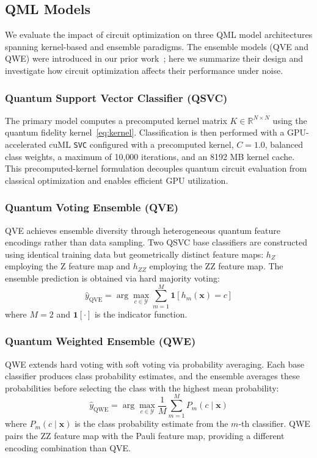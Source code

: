 \documentclass{ieeeaccess}
\begin{document}
\subsection{QML Models}
\label{sec:models}

We evaluate the impact of circuit optimization on three QML model architectures spanning kernel-based and ensemble paradigms. The ensemble models (QVE and QWE) were introduced in our prior work~\cite{AuthorQVEQWE2025}; here we summarize their design and investigate how circuit optimization affects their performance under noise.

\subsubsection{Quantum Support Vector Classifier (QSVC)}
The primary model computes a precomputed kernel matrix $K \in \mathbb{R}^{N \times N}$ using the quantum fidelity kernel~\eqref{eq:kernel}. Classification is then performed with a GPU-accelerated cuML \texttt{SVC} configured with a precomputed kernel, $C = 1.0$, balanced class weights, a maximum of 10{,}000 iterations, and an 8192 MB kernel cache. This precomputed-kernel formulation decouples quantum circuit evaluation from classical optimization and enables efficient GPU utilization.

\subsubsection{Quantum Voting Ensemble (QVE)}
QVE achieves ensemble diversity through heterogeneous quantum feature encodings rather than data sampling. Two QSVC base classifiers are constructed using identical training data but geometrically distinct feature maps: $h_Z$ employing the Z feature map and $h_{ZZ}$ employing the ZZ feature map. The ensemble prediction is obtained via hard majority voting:
\begin{equation}
\hat{y}_{\text{QVE}} = \arg\max_{c \in \mathcal{Y}} \sum_{m=1}^{M} \mathbf{1}[h_m(\mathbf{x}) = c]
\label{eq:qve}
\end{equation}
where $M = 2$ and $\mathbf{1}[\cdot]$ is the indicator function.

\subsubsection{Quantum Weighted Ensemble (QWE)}
QWE extends hard voting with soft voting via probability averaging. Each base classifier produces class probability estimates, and the ensemble averages these probabilities before selecting the class with the highest mean probability:
\begin{equation}
\hat{y}_{\text{QWE}} = \arg\max_{c \in \mathcal{Y}} \frac{1}{M} \sum_{m=1}^{M} P_m(c \mid \mathbf{x})
\label{eq:qwe}
\end{equation}
where $P_m(c \mid \mathbf{x})$ is the class probability estimate from the $m$-th classifier. QWE pairs the ZZ feature map with the Pauli feature map, providing a different encoding combination than QVE.
\end{document}

